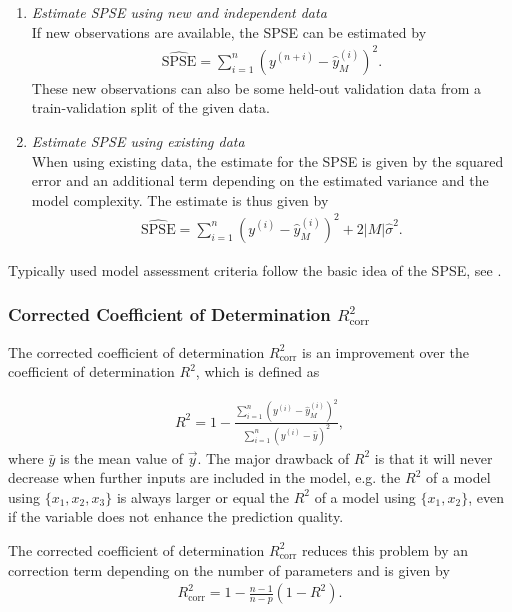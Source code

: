 \begin{enumerate}

	\item \emph{Estimate SPSE using new and independent data} \\	
	If new observations are available, the SPSE can be estimated by
	\begin{align}
		\widehat{\text{SPSE}} = \sum_{i=1}^n \left(y^{(n+i)} - \hat y^{(i)}_M\right)^2.
	\end{align}
	These new observations can also be some held-out validation data from a train-validation split of the given data. 
	
	\item \emph{Estimate SPSE using existing data} \\
	When using existing data, the estimate for the SPSE is given by the squared error and an additional  term depending on the estimated variance and the model complexity. The estimate is thus given by
	\begin{align}
		\widehat{\text{SPSE}} = \sum_{i=1}^n \left(y^{(i)} - \hat y^{(i)}_M\right)^2 + 2\vert M \vert \hat \sigma^2.
	\end{align}

\end{enumerate}

Typically used model assessment criteria follow the basic idea of the SPSE, see \cite{fahrmeir2007regression}.

\subsubsection{Corrected Coefficient of Determination $R_{\mathrm{corr}}^2$}

The corrected coefficient of determination $R^2_{\mathrm{corr}}$ is an improvement over the coefficient of determination $R^2$, which is defined as 

\begin{align}
	R^2 = 1 - \frac{\sum_{i=1}^n \left( y^{(i)} - \hat y^{(i)}_M \right)^2}{\sum_{i=1}^n \left(y^{(i)} - \bar y\right)^2},
\end{align}
%
where $\bar y$ is the mean value of $\vec{y}$. The major drawback of $R^2$ is that it will never decrease when further inputs are included in the model, e.g. the $R^2$ of a model using $\{x_1, x_2, x_3\}$ is always larger or equal the $R^2$ of a model using $\{x_1, x_2\}$, even if the variable does not enhance the prediction quality. 

The corrected coefficient of determination $R_{\mathrm{corr}}^2$ reduces this problem by an correction term depending on the  number of parameters and is given by
\begin{align}
	R_{\mathrm{corr}}^2 = 1 - \frac{n-1}{n-p}(1-R^2).
\end{align}

